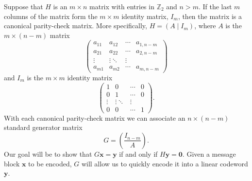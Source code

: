  
Suppose that $H$ is an $m \times n$ matrix with entries in
${\mathbb Z}_2$ and $n > m$. If the last $m$ columns of the
matrix form the $m \times m$ identity matrix, $I_m$, then
the matrix is a {\bfi canonical parity-check
matrix}. More specifically, $H= (A \mid I_m
)$, where $A$ is the $m \times (n-m)$ matrix
\[
\begin{pmatrix}
a_{11} & a_{12} & \cdots & a_{1,n-m} \\
a_{21} & a_{22} & \cdots & a_{2,n-m} \\
\vdots & \vdots \ddots & \vdots    \\
a_{m1} & a_{m2} & \cdots & a_{m,n-m}
\end{pmatrix}
\]
and $I_m$ is the $m \times m$ identity matrix
\[
\begin{pmatrix}
1 & 0 & \cdots & 0 \\
0 & 1 & \cdots & 0 \\
\vdots & \vdots \ddots & \vdots \\
0 & 0 & \cdots & 1
\end{pmatrix}.
\]
With each canonical parity-check matrix we can associate an $n \times
(n-m)$ {\bfi standard generator matrix} 
\[
G =
\left(
\frac{I_{n-m}}{A}
\right).
\]
Our goal will be to show that $G {\mathbf x} = {\mathbf y}$ if and only if
$H{\mathbf y} = {\mathbf 0}$.  Given a message block ${\mathbf x}$ to be
encoded, $G$ will allow us to quickly encode it into a linear
codeword ${\mathbf y}$. 
 
